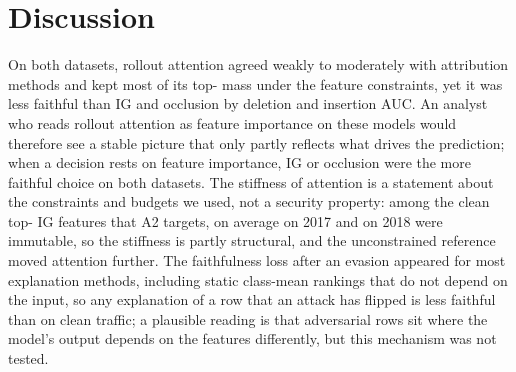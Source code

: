 \section*{Discussion}
\label{sec:discussion}

On both datasets, rollout attention agreed weakly to moderately with attribution methods and kept most of its
top-\paramTopK{} mass under the feature constraints, yet it was less faithful than IG and occlusion by deletion and
insertion AUC.
An analyst who reads rollout attention as feature importance on these models would therefore see a stable picture that
only partly reflects what drives the prediction; when a decision rests on feature importance, IG or occlusion were the
more faithful choice on both datasets.
The stiffness of attention is a statement about the constraints and budgets we used, not a security property: among
the clean top-\paramTopK{} IG features that A2 targets, on average \topImmIGSeventeen{} on 2017 and \topImmIGEighteen{}
on 2018 were immutable, so the stiffness is partly structural, and the unconstrained reference moved attention
further.
The faithfulness loss after an evasion appeared for most explanation methods, including static class-mean rankings that
do not depend on the input, so any explanation of a row that an attack has flipped is less faithful than on clean
traffic; a plausible reading is that adversarial rows sit where the model's output depends on the features
differently, but this mechanism was not tested.

